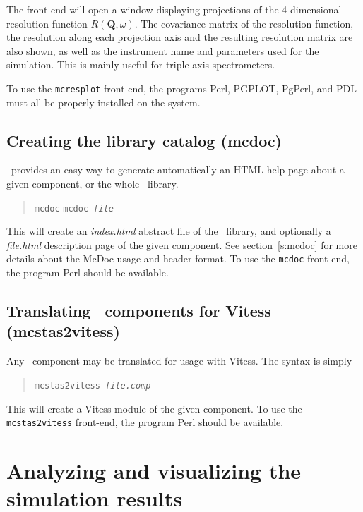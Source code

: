 The front-end will open a window displaying projections of the 4-dimensional
resolution function $R(\boldsymbol{Q}, \omega)$. The covariance matrix of the
resolution function, the resolution along each projection axis and the resulting
resolution matrix are also shown, as well as the instrument name and parameters
used for the simulation. This is mainly useful for triple-axis spectrometers.

To use the \verb+mcresplot+ front-end, the programs Perl, PGPLOT, PgPerl,
and PDL must all be properly installed on the system.

\subsection{Creating the library catalog (mcdoc)}
\label{s:mcdoc-run}

\MCS\ provides an easy way to generate automatically an HTML help page about a given component, or the whole \MCS\ library. 
\begin{quote}
  \texttt{mcdoc}
  \texttt{mcdoc {\it file\/}}
\end{quote}
This will create an {\it index.html} abstract file of the \MCS\ library, and optionally a {\it file.html} description page of the given component. See section~\ref{s:mcdoc} for more details about the McDoc usage and header format.
To use the \verb+mcdoc+ front-end, the program Perl should be available.

\subsection{Translating \MCS\ components for Vitess (mcstas2vitess)}
\label{s:mcstas2vitess}

Any \MCS\ component may be translated for usage with Vitess. The syntax is simply 
\begin{quote}
  \texttt{mcstas2vitess {\it file.comp\/}}
\end{quote}
This will create a Vitess module of the given component.
To use the \verb+mcstas2vitess+ front-end, the program Perl should be available.

\section{Analyzing and visualizing the simulation results}
\label{s:analyze}

